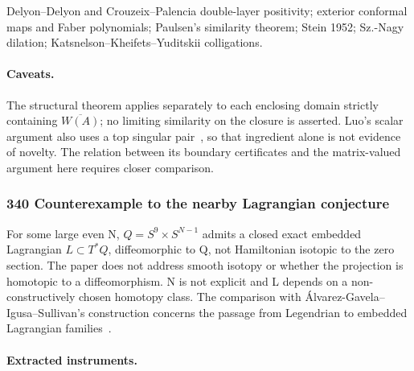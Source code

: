 \documentclass[11pt]{article}
\newcommand{\badges}[1]{\par\noindent{\small\sffamily\color{black!70}#1}\par\smallskip}
\newcommand{\badgesep}{\textbar}
\begin{document}
Delyon--Delyon and Crouzeix--Palencia double-layer positivity; exterior conformal maps and Faber polynomials; Paulsen's similarity theorem; Stein 1952; Sz.-Nagy dilation; Katsnelson--Kheifets--Yuditskii colligations.

\paragraph{Caveats.}

The structural theorem applies separately to each enclosing domain strictly containing $\overline{W(A)}$; no limiting similarity on the closure is asserted. Luo's scalar argument also uses a top singular pair~\cite{src:luo}, so that ingredient alone is not evidence of novelty. The relation between its boundary certificates and the matrix-valued argument here requires closer comparison.

\subsubsection{\texorpdfstring{340 \textperiodcentered{} Counterexample to the nearby Lagrangian conjecture}{340 · Counterexample to the nearby Lagrangian conjecture}}\label{fam:340}
\badges{not formalized \badgesep{} combination}

For some large even N, $Q=S^9\times S^{N-1}$ admits a closed exact embedded Lagrangian $L\subset T^*Q$, diffeomorphic to Q, not Hamiltonian isotopic to the zero section. The paper does not address smooth isotopy or whether the projection is homotopic to a diffeomorphism. N is not explicit and L depends on a non-constructively chosen homotopy class. The comparison with Álvarez-Gavela--Igusa--Sullivan's construction concerns the passage from Legendrian to embedded Lagrangian families~\cite{src:ais}.

\paragraph{Extracted instruments.}
\end{document}
